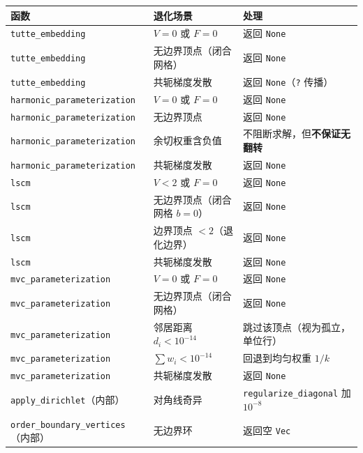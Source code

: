 \documentclass[11pt,a4paper]{article}
\begin{document}
\begin{center}
\renewcommand{\arraystretch}{1.18}
\begin{tabular}{@{}lll@{}}
  \toprule
  \textbf{函数} & \textbf{退化场景} & \textbf{处理} \\
  \midrule
  \texttt{tutte\_embedding}            & $V = 0$ 或 $F = 0$ & 返回 \texttt{None} \\
  \texttt{tutte\_embedding}            & 无边界顶点（闭合网格） & 返回 \texttt{None} \\
  \texttt{tutte\_embedding}            & 共轭梯度发散 & 返回 \texttt{None}（\texttt{?} 传播） \\
  \midrule
  \texttt{harmonic\_parameterization}  & $V = 0$ 或 $F = 0$ & 返回 \texttt{None} \\
  \texttt{harmonic\_parameterization}  & 无边界顶点 & 返回 \texttt{None} \\
  \texttt{harmonic\_parameterization}  & 余切权重含负值 & 不阻断求解，但\textbf{不保证无翻转} \\
  \texttt{harmonic\_parameterization}  & 共轭梯度发散 & 返回 \texttt{None} \\
  \midrule
  \texttt{lscm}                        & $V < 2$ 或 $F = 0$ & 返回 \texttt{None} \\
  \texttt{lscm}                        & 无边界顶点（闭合网格 $b = 0$） & 返回 \texttt{None} \\
  \texttt{lscm}                        & 边界顶点 $< 2$（退化边界） & 返回 \texttt{None} \\
  \texttt{lscm}                        & 共轭梯度发散 & 返回 \texttt{None} \\
  \midrule
  \texttt{mvc\_parameterization}       & $V = 0$ 或 $F = 0$ & 返回 \texttt{None} \\
  \texttt{mvc\_parameterization}       & 无边界顶点（闭合网格） & 返回 \texttt{None} \\
  \texttt{mvc\_parameterization}       & 邻居距离 $d_i < 10^{-14}$ & 跳过该顶点（视为孤立，单位行） \\
  \texttt{mvc\_parameterization}       & $\sum w_i < 10^{-14}$ & 回退到均匀权重 $1/k$ \\
  \texttt{mvc\_parameterization}       & 共轭梯度发散 & 返回 \texttt{None} \\
  \midrule
  \texttt{apply\_dirichlet}（内部）    & 对角线奇异 & \texttt{regularize\_diagonal} 加 $10^{-8}$ \\
  \texttt{order\_boundary\_vertices}（内部） & 无边界环 & 返回空 \texttt{Vec} \\
  \bottomrule
\end{tabular}
\end{center}
\end{document}
